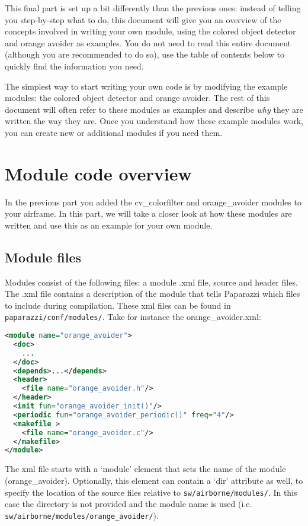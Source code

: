 \documentclass{article}
\begin{document}

This final part is set up a bit differently than the previous ones: instead of telling you step-by-step what to do, this document will give you an overview of the concepts involved in writing your own module, using the colored object detector and orange avoider as examples. You do not need to read this entire document (although you are recommended to do so), use the table of contents below to quickly find the information you need.

The simplest way to start writing your own code is by modifying the example modules: the colored object detector and orange avoider. The rest of this document will often refer to these modules as examples and describe \emph{why} they are written the way they are. Once you understand how these example modules work, you can create new or additional modules if you need them.

\tableofcontents


\section{Module code overview}
In the previous part you added the cv\_colorfilter and orange\_avoider modules to your airframe.
In this part, we will take a closer look at how these modules are written and use this as an example for your own module.

\subsection{Module files}\label{sec:files}
Modules consist of the following files: a module .xml file, source and header files.  The .xml file contains a description of the module that tells Paparazzi which files to include during compilation. These xml files can be found in \texttt{paparazzi/conf/modules/}. Take for instance the orange\_avoider.xml:
\begin{lstlisting}[language=xml]
<module name="orange_avoider">
  <doc>
    ...
  </doc>
  <depends>...</depends>
  <header>
    <file name="orange_avoider.h"/>
  </header>
  <init fun="orange_avoider_init()"/>
  <periodic fun="orange_avoider_periodic()" freq="4"/>
  <makefile >
    <file name="orange_avoider.c"/>
  </makefile>
</module>
\end{lstlisting}
The xml file starts with a `module' element that sets the name of the module (orange\_avoider). Optionally, this element can contain a `dir' attribute as well, to specify the location of the source files relative to \texttt{sw/airborne/modules/}. In this case the directory is not provided and the module name is used (i.e. \texttt{sw/airborne/modules/orange\_avoider/}).
\end{document}
